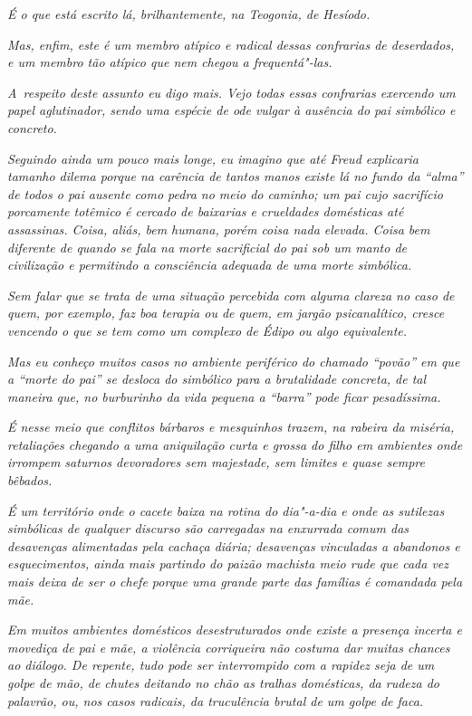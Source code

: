 \emph{É o que está escrito lá, brilhantemente, na Teogonia, de
Hesíodo.}~

\emph{Mas, enfim, este  é um membro atípico e radical dessas
confrarias de deserdados, e um membro tão atípico que nem chegou a
frequentá"-las.}~

\emph{A~respeito deste assunto eu digo mais. Vejo todas essas confrarias
exercendo um papel aglutinador, sendo uma espécie de ode vulgar à
ausência do pai simbólico e concreto.}~

\emph{Seguindo ainda um pouco mais longe, eu imagino que até Freud
explicaria tamanho dilema porque na carência de tantos manos existe lá
no fundo da ``alma'' de todos o pai ausente como pedra no meio do
caminho; um pai cujo sacrifício porcamente totêmico é cercado de
baixarias e crueldades domésticas até assassinas. Coisa, aliás, bem
humana, porém coisa nada elevada. Coisa bem diferente de quando se fala
na morte sacrificial do pai sob um manto de civilização e permitindo a
consciência adequada de uma morte simbólica.}~

\emph{Sem falar que se trata de uma situação percebida com alguma
clareza no caso de quem, por exemplo, faz boa terapia ou de quem, em
jargão psicanalítico, cresce vencendo o que se tem como um complexo de
Édipo ou algo equivalente.}~

\emph{Mas eu conheço muitos casos no ambiente periférico do chamado
``povão'' em que a ``morte do pai'' se desloca do simbólico para a
brutalidade concreta, de tal maneira que, no burburinho da vida pequena
a ``barra'' pode ficar pesadíssima.}~

\emph{É nesse meio que conflitos bárbaros e mesquinhos trazem, na
rabeira da miséria, retaliações chegando a uma aniquilação curta e
grossa do filho em ambientes onde irrompem saturnos devoradores sem
majestade, sem limites e quase sempre bêbados.}~

\emph{É um território onde o cacete baixa na rotina do dia"-a-dia e onde
as sutilezas simbólicas de qualquer discurso são carregadas na enxurrada
comum das desavenças alimentadas pela cachaça diária; desavenças
vinculadas a abandonos e esquecimentos, ainda mais partindo do paizão
machista meio rude que cada vez mais deixa de ser o chefe porque uma
grande parte das famílias é comandada pela mãe.}~

\emph{Em muitos ambientes domésticos desestruturados onde existe a
presença incerta e movediça de pai e mãe, a violência corriqueira não
costuma dar muitas chances ao diálogo. De repente, tudo pode ser
interrompido com a rapidez seja de um golpe de mão, de chutes deitando
no chão as tralhas domésticas, da rudeza do palavrão, ou, nos casos
radicais, da truculência brutal de um golpe de faca.}~

